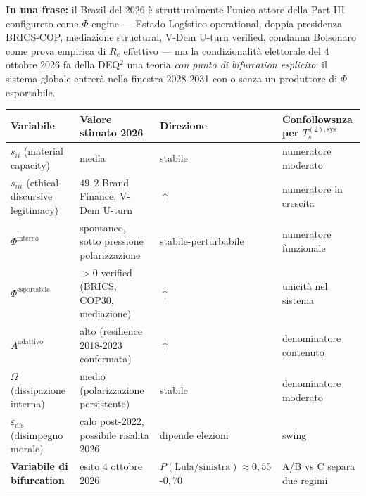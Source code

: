 \Proved{} \textbf{In una frase:} il Brazil del 2026 è strutturalmente
l'unico attore della Part III configureto come \(\Phi\)-engine ---
Estado Logístico operational, doppia presidenza BRICS-COP, mediazione
structural, V-Dem U-turn verified, condanna Bolsonaro come prova
empirica di \(R_c\) effettivo --- ma la condizionalità elettorale del 4
ottobre 2026 fa della DEQ$^2$ una teoria \emph{con punto di bifurcation
esplicito}: il sistema globale entrerà nella finestra 2028-2031 con o
senza un produttore di \(\Phi\) esportabile.

{\def\LTcaptype{none} %
{\small\begin{longtable}[]{@{}
  >{\raggedright\arraybackslash}p{}
  >{\raggedright\arraybackslash}p{}
  >{\raggedright\arraybackslash}p{}
  >{\raggedright\arraybackslash}p{}@{}}
\toprule\noalign{}
\begin{minipage}[b]{\linewidth}\raggedright
Variabile
\end{minipage} & \begin{minipage}[b]{\linewidth}\raggedright
Valore stimato 2026
\end{minipage} & \begin{minipage}[b]{\linewidth}\raggedright
Direzione
\end{minipage} & \begin{minipage}[b]{\linewidth}\raggedright
Confollowsnza per \(T_s^{(2),\text{sys}}\)
\end{minipage} \\
\midrule\noalign{}
\endhead
\bottomrule\noalign{}
\endlastfoot
\(s_{ii}\) (material capacity) & media & stabile & numeratore
moderato \\
\(s_{iii}\) (ethical-discursive legitimacy) & \(49{,}2\) Brand Finance,
V-Dem U-turn & \(\uparrow\) & numeratore in crescita \\
\(\Phi^{\text{interno}}\) & spontaneo, sotto pressione polarizzazione &
stabile-perturbabile & numeratore funzionale \\
\(\Phi^{\text{esportabile}}\) & \(> 0\) verified (BRICS, COP30,
mediazione) & \(\uparrow\) & unicità nel sistema \\
\(A^{\text{adattivo}}\) & alto (resilience 2018-2023 confermata) &
\(\uparrow\) & denominatore contenuto \\
\(\Omega\) (dissipazione interna) & medio (polarizzazione persistente) &
stabile & denominatore moderato \\
\(\varepsilon_{\text{dis}}\) (disimpegno morale) & calo post-2022,
possibile risalita 2026 & dipende elezioni & swing \\
\textbf{Variabile di bifurcation} & esito 4 ottobre 2026 &
\(P(\text{Lula/sinistra}) \approx 0{,}55\)-\(0{,}70\) & A/B vs C separa
due regimi \\
\end{longtable}}
}

